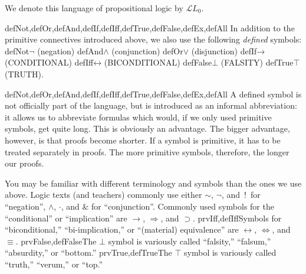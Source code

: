 \documentclass[10pt,a4paper]{article}
\newcommand*{\olup}[1]{\MakeUppercase{#1}}
\theoremstyle{plain}
\theoremstyle{definition}
\theoremstyle{remark}
\newenvironment{explain}{}{}
\providecommand{\lif}{\mathbin{\rightarrow}}
\providecommand{\ltrue}{\top}
\providecommand{\lfalse}{\bot}
\providecommand{\Lang}{\ensuremath{\mathcal{L}}}
\providecommand{\iftag}[1]{#1}
\providecommand{\liff}{\mathbin{\leftrightarrow}}
\providecommand{\iftag}{}
\begin{document}
We denote this language of propositional logic by $\Lang L_0$.

\iftag{defNot,defOr,defAnd,defIf,defIff,defTrue,defFalse,defEx,defAll}{%
In addition to the primitive connectives introduced
above, we also use the following \emph{defined} symbols:
\startycommalist
  \iftag{defNot}{\ycomma $\lnot$ (negation)}{}%
  \iftag{defAnd}{\ycomma $\land$ (conjunction)}{}%
  \iftag{defOr}{\ycomma $\lor$ (disjunction)}{}%
  \iftag{defIf}{\ycomma $\lif$ (\olup{conditional})}{}%
  \iftag{defIff}{\ycomma $\liff$ (\olup{biconditional})}{}%
  \iftag{defFalse}{\ycomma $\lfalse$ (\olup{falsity})}{}%
  \iftag{defTrue}{\ycomma $\ltrue$ (\olup{truth})}}{}.

\begin{tagblock}{defNot,defOr,defAnd,defIf,defIff,defTrue,defFalse,defEx,defAll}
\begin{explain}
A defined symbol is not officially part of the language, but is
introduced as an informal abbreviation: it allows us to abbreviate
formulas which would, if we only used primitive symbols, get quite
long.  This is obviously an advantage.  The bigger advantage, however,
is that proofs become shorter.  If a symbol is primitive, it has to be
treated separately in proofs. The more primitive symbols, therefore,
the longer our proofs.
\end{explain}
\end{tagblock}


\begin{intro}
You may be familiar with different terminology and symbols than the
ones we use above. Logic texts (and teachers) commonly use either
$\sim$, $\neg$, and~!\ for ``negation'', $\wedge$, $\cdot$, and $\&$
for ``conjunction''.  Commonly used symbols for the ``conditional'' or
``implication'' are $\rightarrow$, $\Rightarrow$, and $\supset$.
\iftag{prvIff,defIff}{Symbols for ``biconditional,'' ``bi-implication,''
  or ``(material) equivalence'' are $\leftrightarrow$,
  $\Leftrightarrow$, and $\equiv$.}{}
\iftag{prvFalse,defFalse}{The $\lfalse$ symbol is variously called
  ``falsity,'' ``falsum,'' ``absurdity,'' or ``bottom.''}{}
\iftag{prvTrue,defTrue}{The $\ltrue$ symbol is variously called
  ``truth,'' ``verum,'' or ``top.''}{}
\end{intro}
\end{document}
